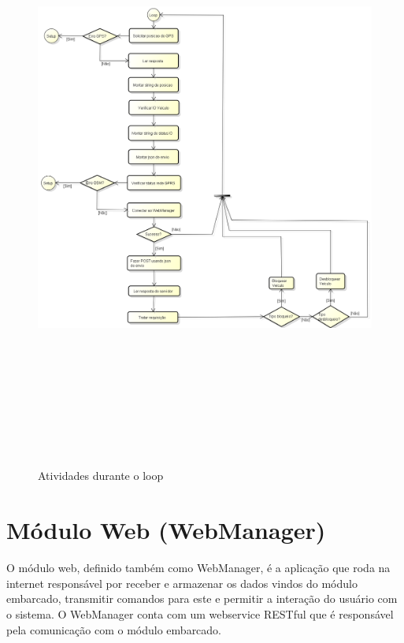 \begin{figure}[!h]
	\centering
	\includegraphics[width=1.1\textwidth, height=20cm]{figures/ModuloVeicular_Loop.png}
	\caption{Atividades durante o loop}
	\label{fig:seqloop}
\end{figure}

\newpage

\section{Módulo Web (WebManager)}

O módulo web, definido também como WebManager, é a aplicação que roda na internet responsável por receber e armazenar os dados vindos do módulo embarcado, transmitir comandos para este e permitir a interação do usuário com o sistema. O WebManager conta com um webservice RESTful que é responsável pela comunicação com o módulo embarcado.

